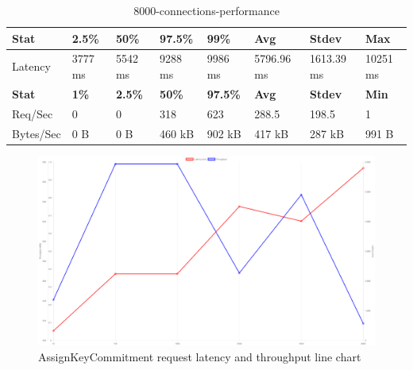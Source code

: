 \documentclass[../Main.tex]{subfiles}
\begin{document}
\begin{table}[H]
  \centering
  \begin{tabular}{|l|l|l|l|l|l|l|l|}
    \hline
    \rowcolor[HTML]{f56b00}
    \textbf{Stat} & \textbf{2.5\%} & \textbf{50\%} & \textbf{97.5\%} & \textbf{99\%} & \textbf{Avg} & \textbf{Stdev} & \textbf{Max} \\
    \hline
    Latency & 3777 ms & 5542 ms & 9288 ms & 9986 ms & 5796.96 ms & 1613.39 ms & 10251 ms \\
    \hline
    \rowcolor[HTML]{f56b00}
    \textbf{Stat} & \textbf{1\%} & \textbf{2.5\%} & \textbf{50\%} & \textbf{97.5\%} & \textbf{Avg} & \textbf{Stdev} & \textbf{Min} \\
    \hline
    Req/Sec & 0 & 0 & 318 & 623 & 288.5 & 198.5 & 1 \\
    Bytes/Sec & 0 B & 0 B & 460 kB & 902 kB & 417 kB & 287 kB & 991 B \\
    \hline
  \end{tabular}
  \caption{8000-connections-performance}
  \label{8000-connections-performance}
\end{table}

\begin{figure}[H]
  \centering
  \includegraphics[scale=0.22]{Figure/assignkeycommitment-line-chart.png}
  \caption{AssignKeyCommitment request latency and throughput line chart}
  \label{fig:assignkeycommitment-line-chart}
\end{figure}
\end{document}

